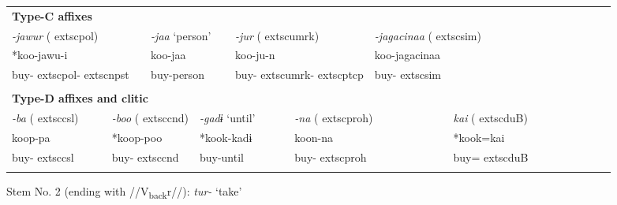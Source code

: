 \begin{tabularx}{\textwidth}{XXXXXXXXXXXXXXXXXXXXXXX}
\multicolumn{23}{X}{{\bfseries Type-C affixes}}\\
\multicolumn{3}{X}{{ \textit{{}-jawur} (	extsc{pol})}} & \multicolumn{2}{X}{{ \textit{{}-jaa} ‘person’}} & \multicolumn{5}{X}{{ \textit{{}-jur} (	extsc{umrk})}} & \multicolumn{4}{X}{{ \textit{{}-jagacinaa} (	extsc{sim})}} & \multicolumn{9}{X}{}\\
\multicolumn{3}{X}{{ *koo-jawu-i}} & \multicolumn{2}{X}{{ koo-jaa}} & \multicolumn{5}{X}{koo-ju-n} & \multicolumn{4}{X}{{ koo-jagacinaa}} & \multicolumn{9}{X}{}\\
\multicolumn{3}{X}{buy-	extsc{pol}-	extsc{npst}} & \multicolumn{2}{X}{buy-person} & \multicolumn{5}{X}{buy-	extsc{umrk}-	extsc{ptcp}} & \multicolumn{4}{X}{buy-	extsc{sim}} & \multicolumn{9}{X}{}\\
\multicolumn{23}{X}{}\\
\multicolumn{23}{X}{{\bfseries Type-D affixes and clitic}}\\
{ \textit{{}-ba} (	extsc{csl})} & \multicolumn{3}{X}{{ \textit{{}-boo} (	extsc{cnd})}} & \multicolumn{4}{X}{{ \textit{{}-gadɨ} ‘until’}} & \multicolumn{4}{X}{{ \textit{{}-na} (	extsc{proh})}} & \multicolumn{4}{X}{{ \textit{kai} (	extsc{du}B)}} & \multicolumn{7}{X}{}\\
{ koop-pa} & \multicolumn{3}{X}{{ *koop-poo}} & \multicolumn{4}{X}{{ *kook-kadɨ}} & \multicolumn{4}{X}{{ koon-na}} & \multicolumn{4}{X}{{ *kook=kai}} & \multicolumn{7}{X}{}\\
buy-	extsc{csl} & \multicolumn{3}{X}{buy-	extsc{cnd}} & \multicolumn{4}{X}{buy-until} & \multicolumn{4}{X}{buy-	extsc{proh}} & \multicolumn{4}{X}{buy=	extsc{du}B} & \multicolumn{7}{X}{}\\
\lspbottomrule
\end{tabularx}
Stem No. 2 (ending with //V\textsubscript{back}r//): \textit{tur-} ‘take’

\tablefirsthead{}

